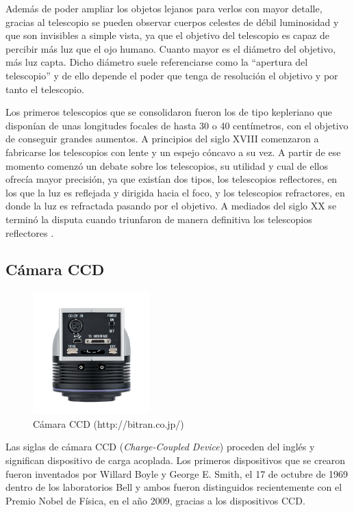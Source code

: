 Además de poder ampliar los objetos lejanos para verlos con mayor detalle, gracias al telescopio se pueden observar cuerpos celestes de débil luminosidad y que son invisibles a simple vista, ya que el objetivo del telescopio es capaz de percibir más luz que el ojo humano. Cuanto mayor es el diámetro del objetivo, más luz capta. Dicho diámetro suele referenciarse como la “apertura del telescopio” y de ello depende el poder que tenga de resolución el objetivo y por tanto el telescopio.

Los primeros telescopios que se consolidaron fueron los de tipo kepleriano que disponían de unas longitudes focales de hasta 30 o 40 centímetros, con el objetivo de conseguir grandes aumentos.
A principios del siglo XVIII comenzaron a fabricarse los telescopios con lente y un espejo cóncavo a su vez. A partir de ese momento comenzó un debate sobre los telescopios, su utilidad y cual de ellos ofrecía mayor precisión, ya que existían dos tipos, los telescopios reflectores, en los que la luz es reflejada y dirigida hacia el foco, y los telescopios refractores, en donde  la luz es refractada pasando por el objetivo.
A mediados del siglo XX se terminó la disputa cuando triunfaron de manera definitiva los telescopios reflectores \cite{Telescopio}.

\subsection{Cámara CCD}
\begin{figure}[htb]
\centering
\includegraphics[width=0.4\textwidth]{./imagenes/ccd}
\caption{Cámara CCD (http://bitran.co.jp/)} \label{fig:ccd}
\end{figure}
Las siglas de cámara CCD (\textit{Charge-Coupled Device}) proceden del inglés y significan dispositivo de carga acoplada. Los primeros dispositivos que se crearon fueron inventados por Willard Boyle y George E. Smith, el 17 de octubre de 1969 dentro de los laboratorios Bell y ambos fueron distinguidos recientemente con el Premio Nobel de Física, en el año 2009, gracias a los dispositivos CCD.

